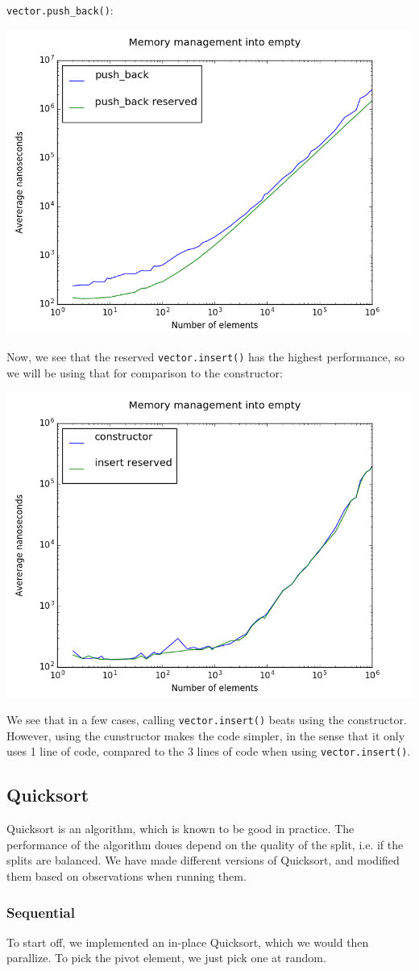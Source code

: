 \texttt{vector.push\_back()}:
\begin{center}
\includegraphics[width=.5\linewidth]{graphs/memmanempty_push}
\end{center}

Now, we see that the reserved \texttt{vector.insert()} has the highest
performance, so we will be using that for comparison to the constructor:
\begin{center}
\includegraphics[width=.5\linewidth]{graphs/memmanempty_constr}
\end{center}
We see that in a few cases, calling \texttt{vector.insert()} beats using the
constructor. However, using the cunstructor makes the code simpler, in the
sense that it only uses 1 line of code, compared to the 3 lines of code when
using \texttt{vector.insert()}.

\subsection{Quicksort}
Quicksort is an algorithm, which is known to be good in practice. The
performance of the algorithm doues depend on the quality of the split, i.e. if
the splits are balanced. We have made different versions of Quicksort, and
modified them based on observations when running them.

\subsubsection{Sequential}
To start off, we implemented an in-place Quicksort, which we would then
parallize. To pick the pivot element, we just pick one at random.

